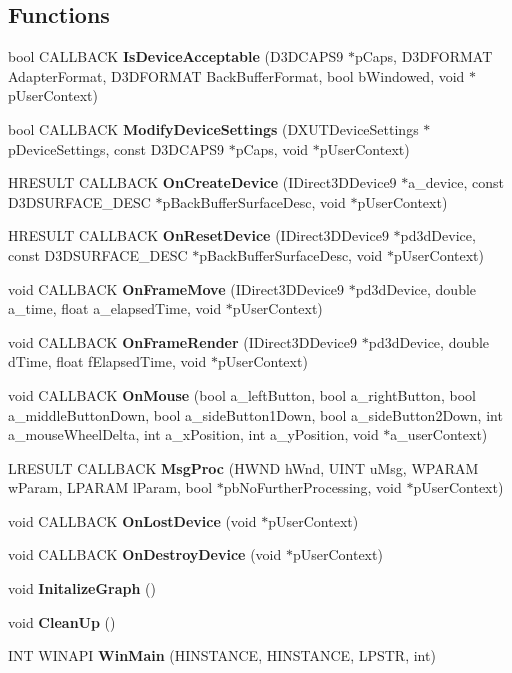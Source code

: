 \subsection*{Functions}
\begin{DoxyCompactItemize}
\item 
bool CALLBACK {\bf IsDeviceAcceptable} (D3DCAPS9 $\ast$pCaps, D3DFORMAT AdapterFormat, D3DFORMAT BackBufferFormat, bool bWindowed, void $\ast$pUserContext)
\item 
bool CALLBACK {\bf ModifyDeviceSettings} (DXUTDeviceSettings $\ast$pDeviceSettings, const D3DCAPS9 $\ast$pCaps, void $\ast$pUserContext)
\item 
HRESULT CALLBACK {\bf OnCreateDevice} (IDirect3DDevice9 $\ast$a\_\-device, const D3DSURFACE\_\-DESC $\ast$pBackBufferSurfaceDesc, void $\ast$pUserContext)
\item 
HRESULT CALLBACK {\bf OnResetDevice} (IDirect3DDevice9 $\ast$pd3dDevice, const D3DSURFACE\_\-DESC $\ast$pBackBufferSurfaceDesc, void $\ast$pUserContext)
\item 
void CALLBACK {\bf OnFrameMove} (IDirect3DDevice9 $\ast$pd3dDevice, double a\_\-time, float a\_\-elapsedTime, void $\ast$pUserContext)
\item 
void CALLBACK {\bf OnFrameRender} (IDirect3DDevice9 $\ast$pd3dDevice, double dTime, float fElapsedTime, void $\ast$pUserContext)
\item 
void CALLBACK {\bf OnMouse} (bool a\_\-leftButton, bool a\_\-rightButton, bool a\_\-middleButtonDown, bool a\_\-sideButton1Down, bool a\_\-sideButton2Down, int a\_\-mouseWheelDelta, int a\_\-xPosition, int a\_\-yPosition, void $\ast$a\_\-userContext)
\item 
LRESULT CALLBACK {\bf MsgProc} (HWND hWnd, UINT uMsg, WPARAM wParam, LPARAM lParam, bool $\ast$pbNoFurtherProcessing, void $\ast$pUserContext)
\item 
void CALLBACK {\bf OnLostDevice} (void $\ast$pUserContext)
\item 
void CALLBACK {\bf OnDestroyDevice} (void $\ast$pUserContext)
\item 
void {\bf InitalizeGraph} ()
\item 
void {\bf CleanUp} ()
\item 
INT WINAPI {\bf WinMain} (HINSTANCE, HINSTANCE, LPSTR, int)
\end{DoxyCompactItemize}
